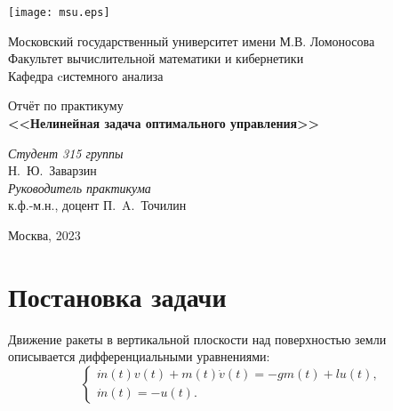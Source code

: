 \documentclass[a4paper,12pt]{article}
\begin{document}
\newcommand{\sgn}{\mathrm{sgn}}

\begin{titlepage}
\begin{center}
\texttt{[image: msu.eps]}
\end{center}

\begin{center}
Московский государственный университет имени М.В. Ломоносова\\
\vspace{0.2cm}
Факультет вычислительной математики и кибернетики\\
\vspace{0.2cm}
Кафедра cистемного анализа

\vspace{3.75cm}
{\LARGE Отчёт по практикуму}\\
\vspace{1cm}
{\Huge\bfseries <<Нелинейная задача оптимального управления>>}
\end{center}

\vspace{1.75cm}
\begin{flushright}
\large
\textit{Студент 315 группы}\\
Н.~Ю.~Заварзин\\
\vspace{5mm}
\textit{Руководитель практикума}\\
к.ф.-м.н., доцент П.~A.~Точилин\\
\end{flushright}
\vspace{4cm}

\begin{center}
Москва, 2023
\end{center}
\end{titlepage} 


\newpage

\tableofcontents

\newpage
\section{Постановка задачи}
Движение ракеты в вертикальной плоскости над поверхностью земли описывается дифференциальными уравнениями:
\hypertarget{p1}{}
\begin{equation} \label{eq1}
	\begin{cases} 
		\dot{m}(t) v(t) + m(t)\dot{v}(t) = -gm(t) + lu(t), \\
		\dot{m}(t) = -u(t).
	\end{cases}
\end{equation}
\end{document}
